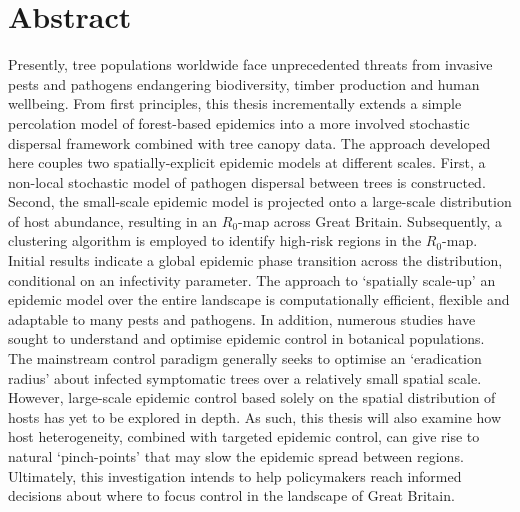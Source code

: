 \chapter*{Abstract}

Presently, tree populations worldwide face unprecedented threats from invasive pests and pathogens endangering biodiversity, timber production and human wellbeing. 
From first principles, this thesis incrementally extends a simple percolation model of forest-based epidemics into a more involved stochastic dispersal framework combined with tree canopy data. 
The approach developed here couples two spatially-explicit epidemic models at different scales. 
First, a non-local stochastic model of pathogen dispersal between trees is constructed. 
Second, the small-scale epidemic model is projected onto a large-scale distribution of host abundance, resulting in an $R_0$-map across Great Britain. 
Subsequently, a clustering algorithm is employed to identify high-risk regions in the $R_0$-map. 
Initial results indicate a global epidemic phase transition across the distribution, conditional on an infectivity parameter.
The approach to `spatially scale-up' an epidemic model over the entire landscape is computationally efficient, flexible and adaptable to many pests and pathogens. 
In addition, numerous studies have sought to understand and optimise epidemic control in botanical populations. 
The mainstream control paradigm generally seeks to optimise an `eradication radius' about infected symptomatic trees over a relatively small spatial scale. However, large-scale epidemic control based solely on the spatial distribution of hosts has yet to be explored in depth. 
As such, this thesis will also examine how host heterogeneity, combined with targeted epidemic control, can give rise to natural `pinch-points' that may slow the epidemic spread between regions. 
Ultimately, this investigation intends to help policymakers reach informed decisions about where to focus control in the landscape of Great Britain.

\newcommand{\RNum}[1]{\uppercase\expandafter{\romannumeral #1\relax}}
